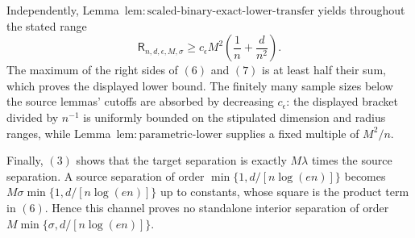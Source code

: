 Independently, Lemma~\(\mathrm{lem:scaled\text{-}binary\text{-}exact\text{-}lower\text{-}transfer}\) yields throughout the stated range
\[
 \mathsf R_{n,d,\epsilon,M,\sigma}
 \ge c_{\epsilon}M^2\left(\frac1n+\frac d{n^2}\right).
\tag{7}
\]
The maximum of the right sides of \((6)\) and \((7)\) is at least half their sum, which proves the displayed lower bound.  The finitely many sample sizes below the source lemmas' cutoffs are absorbed by decreasing \(c_{\epsilon}\): the displayed bracket divided by \(n^{-1}\) is uniformly bounded on the stipulated dimension and radius ranges, while Lemma~\(\mathrm{lem:parametric\text{-}lower}\) supplies a fixed multiple of \(M^2/n\).

Finally, \((3)\) shows that the target separation is exactly \(M\lambda\) times the source separation.  A source separation of order \(\min\{1,d/[n\log(en)]\}\) becomes \(M\sigma\min\{1,d/[n\log(en)]\}\) up to constants, whose square is the product term in \((6)\).  Hence this channel proves no standalone interior separation of order \(M\min\{\sigma,d/[n\log(en)]\}\).